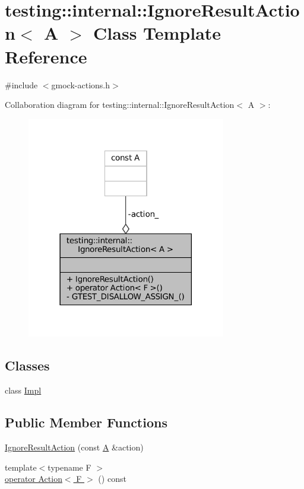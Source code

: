 \hypertarget{classtesting_1_1internal_1_1IgnoreResultAction}{}\section{testing\+:\+:internal\+:\+:Ignore\+Result\+Action$<$ A $>$ Class Template Reference}
\label{classtesting_1_1internal_1_1IgnoreResultAction}


{\ttfamily \#include $<$gmock-\/actions.\+h$>$}



Collaboration diagram for testing\+:\+:internal\+:\+:Ignore\+Result\+Action$<$ A $>$\+:
\nopagebreak
\begin{figure}[H]
\begin{center}
\leavevmode
\includegraphics[width=246pt]{classtesting_1_1internal_1_1IgnoreResultAction__coll__graph}
\end{center}
\end{figure}
\subsection*{Classes}
\begin{DoxyCompactItemize}
\item 
class \hyperlink{classtesting_1_1internal_1_1IgnoreResultAction_1_1Impl}{Impl}
\end{DoxyCompactItemize}
\subsection*{Public Member Functions}
\begin{DoxyCompactItemize}
\item 
\hyperlink{classtesting_1_1internal_1_1IgnoreResultAction_a9199f7b1b7771b2e2a5fd28caf624623}{Ignore\+Result\+Action} (const \hyperlink{namespacetesting_a5e9134d655d2fc9323902348083282e7}{A} \&action)
\item 
{\footnotesize template$<$typename F $>$ }\\\hyperlink{classtesting_1_1internal_1_1IgnoreResultAction_affb8b7439604c860e1416f45339c6e37}{operator Action$<$ F $>$} () const
\end{DoxyCompactItemize}
